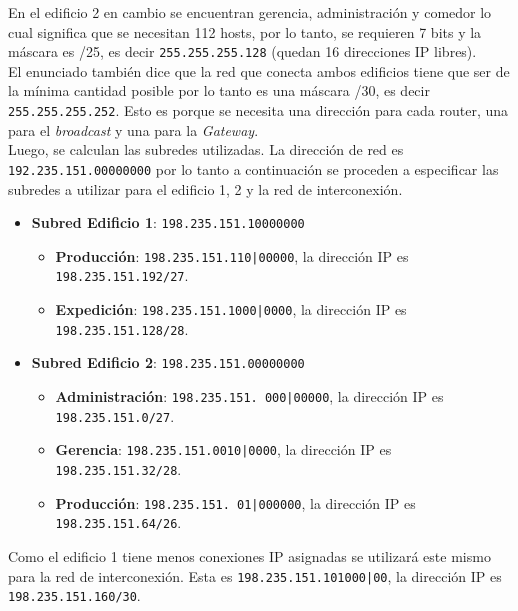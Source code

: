 En el edificio 2 en cambio se encuentran gerencia, administración y comedor lo cual significa que se necesitan 112 hosts, por lo tanto, se requieren 7 bits y la máscara es /25, es decir \texttt{255.255.255.128} (quedan 16 direcciones IP libres).\\

El enunciado también dice que la red que conecta ambos edificios tiene que ser de la mínima cantidad posible por lo tanto es una máscara /30, es decir \texttt{255.255.255.252}. Esto es porque se necesita una dirección para cada router, una para el \textit{broadcast} y una para la \textit{Gateway}. \\

Luego, se calculan las subredes utilizadas. La dirección de red es \texttt{192.235.151.00000000} por lo tanto a continuación se proceden a especificar las subredes a utilizar para el edificio 1, 2 y la red de interconexión.\\

\begin{itemize}
    \item \textbf{Subred Edificio 1}: \texttt{198.235.151.10000000} 
    \begin{itemize}
        \item \textbf{Producción}: \texttt{198.235.151.110|00000}, la dirección IP es \texttt{198.235.151.192/27}.
        \item \textbf{Expedición}: \texttt{198.235.151.1000|0000}, la dirección IP es \texttt{198.235.151.128/28}.
    \end{itemize}
    \item \textbf{Subred Edificio 2}: \texttt{198.235.151.00000000} 
    \begin{itemize}
        \item \textbf{Administración}: \texttt{198.235.151. 000|00000}, la dirección IP es \texttt{198.235.151.0/27}.
        \item \textbf{Gerencia}: \texttt{198.235.151.0010|0000}, la dirección IP es \texttt{198.235.151.32/28}.
        \item \textbf{Producción}: \texttt{198.235.151. 01|000000}, la dirección IP es \texttt{198.235.151.64/26}.
    \end{itemize}
\end{itemize}

Como el edificio 1 tiene menos conexiones IP asignadas se utilizará este mismo para la red de interconexión. Esta es \texttt{198.235.151.101000|00}, la dirección IP es \texttt{198.235.151.160/30}.\\

